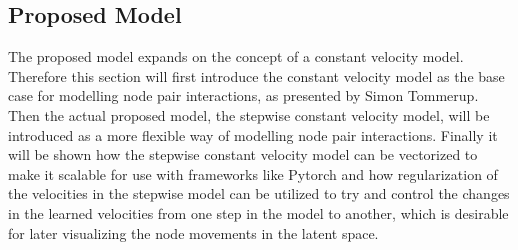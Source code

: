 \subsection{Proposed Model}
\label{sec:Method:ProposedModel}
The proposed model expands on the concept of a constant velocity model. Therefore this section will first introduce the constant velocity model as the base case for modelling node pair interactions, as presented by Simon Tommerup\cite{Tommerup2021LearningNetworks}. Then the actual proposed model, the stepwise constant velocity model, will be introduced as a more flexible way of modelling node pair interactions.  Finally it will be shown how the stepwise constant velocity model can be vectorized to make it scalable for use with frameworks like Pytorch and how regularization of the velocities in the stepwise model can be utilized to try and control the changes in the learned velocities from one step in the model to another, which is desirable for later visualizing the node movements in the latent space.


